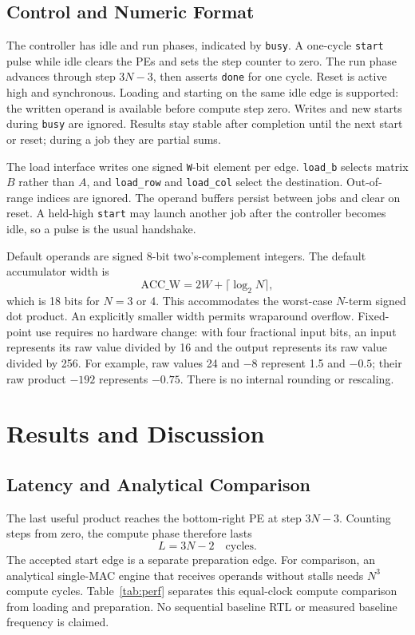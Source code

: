 \documentclass[conference]{IEEEtran}
\begin{document}
\subsection{Control and Numeric Format}
The controller has idle and run phases, indicated by \texttt{busy}. A one-cycle \texttt{start} pulse while idle clears the PEs and sets the step counter to zero. The run phase advances through step $3N-3$, then asserts \texttt{done} for one cycle. Reset is active high and synchronous. Loading and starting on the same idle edge is supported: the written operand is available before compute step zero. Writes and new starts during \texttt{busy} are ignored. Results stay stable after completion until the next start or reset; during a job they are partial sums.

The load interface writes one signed \texttt{W}-bit element per edge. \texttt{load\_b} selects matrix $B$ rather than $A$, and \texttt{load\_row} and \texttt{load\_col} select the destination. Out-of-range indices are ignored. The operand buffers persist between jobs and clear on reset. A held-high \texttt{start} may launch another job after the controller becomes idle, so a pulse is the usual handshake.

Default operands are signed 8-bit two's-complement integers. The default accumulator width is
\begin{equation}
\mathrm{ACC\_W}=2W+\lceil\log_2 N\rceil,
\end{equation}
which is 18 bits for $N=3$ or 4. This accommodates the worst-case $N$-term signed dot product. An explicitly smaller width permits wraparound overflow. Fixed-point use requires no hardware change: with four fractional input bits, an input represents its raw value divided by 16 and the output represents its raw value divided by 256. For example, raw values 24 and $-8$ represent 1.5 and $-0.5$; their raw product $-192$ represents $-0.75$. There is no internal rounding or rescaling.

\section{Results and Discussion}
\subsection{Latency and Analytical Comparison}
The last useful product reaches the bottom-right PE at step $3N-3$. Counting steps from zero, the compute phase therefore lasts
\begin{equation}
L=3N-2\quad\text{cycles}.
\end{equation}
The accepted start edge is a separate preparation edge. For comparison, an analytical single-MAC engine that receives operands without stalls needs $N^3$ compute cycles. Table~\ref{tab:perf} separates this equal-clock compute comparison from loading and preparation. No sequential baseline RTL or measured baseline frequency is claimed.
\end{document}
